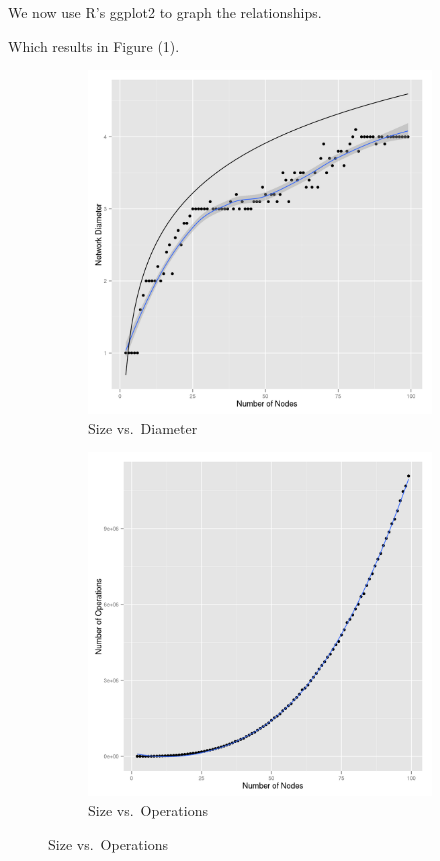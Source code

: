 \documentclass[10pt]{article}
\begin{document}
\begin{easylist}[enumerate]
    We now use {\ttfamily R}'s {\ttfamily ggplot2} to graph the relationships.

    Which results in Figure (1).

    \begin{figure}[ht]
        \centering
        \begin{subfigure}[b]{0.48\textwidth}
            \includegraphics[scale=0.35]{./img/sizevsdiameter.png}
            \caption{Size vs.\ Diameter}
        \end{subfigure}
        \begin{subfigure}[b]{0.48\textwidth}
            \includegraphics[scale=0.35]{./img/sizevsoperations.png}
            \caption{Size vs.\ Operations}
        \end{subfigure}


\end{figure}
\end{easylist}
\end{document}

